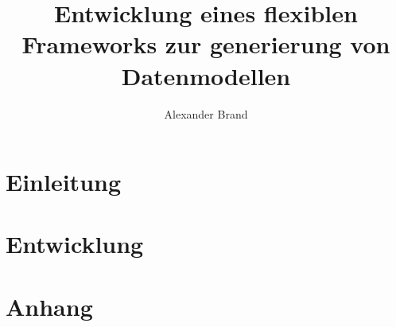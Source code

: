 \documentclass[german]{abarbeit}
\title{Entwicklung eines flexiblen Frameworks zur generierung von Datenmodellen}
\author{Alexander Brand}
\begin{document}
\maketitle
\tableofcontents
\chapter{Einleitung}


\chapter{Entwicklung}



\chapter{Anhang}

\end{document}
